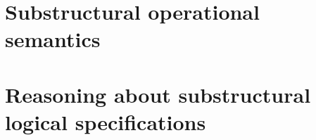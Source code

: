 \documentclass[12pt]{cmuthesis}
\begin{document}






\part{Substructural operational semantics}









\part{Reasoning about substructural logical specifications}







\appendix








\end{document}

